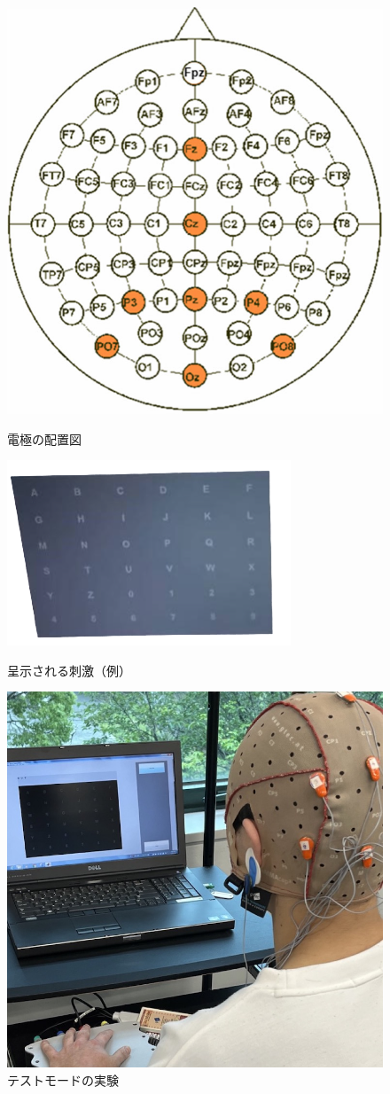 \begin{figure}[H]
    \centering
    \begin{minipage}[b]{.32\textwidth}
        \centering
        \includegraphics[keepaspectratio,width=.6\textwidth]{../../12_DataAnalysis/denkyoku.png}
        \caption{電極の配置図\footnotemark[2]}
        \label{fig:電極の配置図}
    \end{minipage}
    \begin{minipage}[b]{.32\textwidth}
        \centering
        \includegraphics[keepaspectratio,width=.6\textwidth]{../../12_DataAnalysis/bmi-shigeki.png}
        \caption{呈示される刺激（例）}
    \end{minipage}
    \begin{minipage}[b]{.32\textwidth}
        \centering
        \includegraphics[keepaspectratio,width=.6\textwidth]{../../12_DataAnalysis/bmi_exp2.jpeg}
        \caption{テストモードの実験}
    \end{minipage}
\end{figure}

